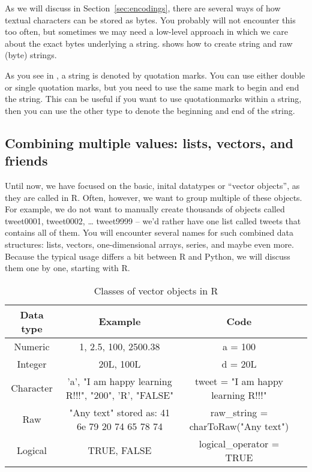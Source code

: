 
As we will discuss in Section~\ref{sec:encodings}, there are several
ways of how textual characters can be stored as bytes. You probably
will not encounter this too often, but sometimes we may need a
low-level approach in which we care about the exact bytes underlying a
string.  shows how to create string and raw (byte)
strings.

As you see in , a string is denoted by quotation
marks. You can use either double or single quotation marks, but you
need to use the same mark to begin and end the string. This can be
useful if you want to use quotationmarks within a string, then you can
use the other type to denote the beginning and end of the string.




\subsection{Combining multiple values: lists, vectors, and friends}

Until now, we have focused on the basic, inital datatypes or ``vector
objects'', as they are called in R.  Often, however, we want to group
multiple of these objects. For example, we do not want to manually
create thousands of objects called tweet0001, tweet0002, \ldots
tweet9999 -- we'd rather have one list called tweets that contains all
of them. You will encounter several names for such combined data
structures: lists, vectors, one-dimensional arrays, series, and maybe
even more. Because the typical usage differs a bit between R and
Python, we will discuss them one by one, starting with R.


\begin{table}[ht]
\label{tab:vector_objects}
\caption{Classes of vector objects in R\label{table:nonlin}}{%
\centering
\begin{tabular}{c c c p{2cm}}
\hline\hline
Data type & Example & Code \\ [0.5ex]
\hline
Numeric&1, 2.5, 100, 2500.38& a = 100 \\
Integer&20L, 100L&d = 20L \\
Character&   \parbox[t]{4cm}{\centering 'a', "I am happy learning R!!!", "200", 'R', "FALSE"} & tweet  = "I am happy learning R!!!" \\
Raw& \parbox[t]{4cm}{\centering "Any text" stored as:  41 6e 79 20 74 65 78 74} & raw\_string  = charToRaw("Any text") \\
Logical& TRUE, FALSE & logical\_operator  = TRUE  \\ [1ex]
\hline
\end{tabular}}{}
\end{table}


